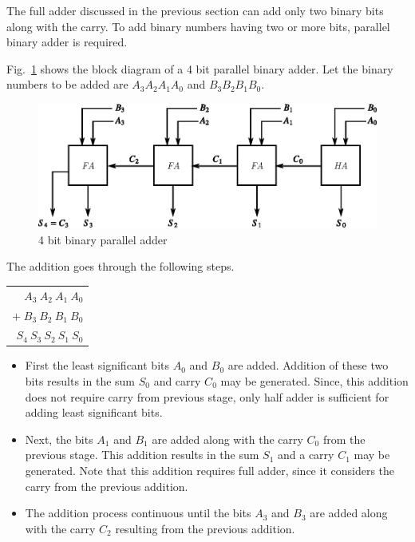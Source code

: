 The full adder discussed in the previous section can add only two binary bits along with the carry. To add binary numbers having two or more bits, parallel binary adder is required.

Fig.~\ref{fig6.35} shows the block diagram of a 4 bit parallel binary adder. Let the binary numbers to be added are $A_{3}A_{2}A_{1}A_{0}$ and $B_{3}B_{2}B_{1}B_{0}$.\begin{figure}[H]
\centering
\includegraphics{chap6/fig132.eps}
\caption{4 bit binary parallel adder}\label{fig6.35}
\end{figure}

The addition goes through the following steps.
\begin{center}
\begin{tabular}{r}
$A_{3} \ A_{2} \ A_{1} \ A_{0}$\\[5pt]
$+\; B_{3} \ B_{2} \ B_{1} \ B_{0}$\\[4pt]
\hline
$S_{4} \ S_{3} \ S_{2} \ S_{1} \ S_{0}$\\[4pt]
\hline
\end{tabular}
\end{center}
\begin{itemize}
\item First the least significant bits $A_{0}$ and $B_{0}$ are added. Addition of these two bits results in the sum $S_{0}$ and carry $C_{0}$ may be generated. Since, this addition does not require carry from previous stage, only half adder is sufficient for adding least significant bits.

\item Next, the bits $A_{1}$ and $B_{1}$ are added along with the carry $C_{0}$ from the previous stage. This addition results in the sum $S_{1}$ and a carry $C_{1}$ may be generated. Note that this addition requires full adder, since it considers the carry from the previous addition.

\item The addition process continuous until the bits $A_{3}$ and $B_{3}$ are added along with the carry $C_{2}$ resulting from the previous addition.
\end{itemize}

